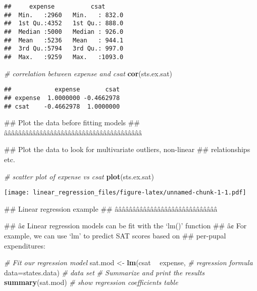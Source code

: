 \documentclass[]{article}
\newenvironment{Shaded}{\begin{snugshade}}{\end{snugshade}}
\newcommand{\KeywordTok}[1]{\textcolor[rgb]{0.13,0.29,0.53}{\textbf{#1}}}
\newcommand{\DataTypeTok}[1]{\textcolor[rgb]{0.13,0.29,0.53}{#1}}
\newcommand{\StringTok}[1]{\textcolor[rgb]{0.31,0.60,0.02}{#1}}
\newcommand{\CommentTok}[1]{\textcolor[rgb]{0.56,0.35,0.01}{\textit{#1}}}
\newcommand{\OperatorTok}[1]{\textcolor[rgb]{0.81,0.36,0.00}{\textbf{#1}}}
\newcommand{\NormalTok}[1]{#1}
\begin{document}
\begin{verbatim}
##     expense          csat       
##  Min.   :2960   Min.   : 832.0  
##  1st Qu.:4352   1st Qu.: 888.0  
##  Median :5000   Median : 926.0  
##  Mean   :5236   Mean   : 944.1  
##  3rd Qu.:5794   3rd Qu.: 997.0  
##  Max.   :9259   Max.   :1093.0
\end{verbatim}

\begin{Shaded}
\begin{Highlighting}[]
\CommentTok{# correlation between expense and csat}
\KeywordTok{cor}\NormalTok{(sts.ex.sat)}
\end{Highlighting}
\end{Shaded}

\begin{verbatim}
##            expense       csat
## expense  1.0000000 -0.4662978
## csat    -0.4662978  1.0000000
\end{verbatim}

\begin{Shaded}
\begin{Highlighting}[]
\NormalTok{## Plot the data before fitting models}
\NormalTok{## âââââââââââââââââââââââââââââââââââââââ}

\NormalTok{##   Plot the data to look for multivariate outliers, non-linear}
\NormalTok{##   relationships etc.}

\CommentTok{# scatter plot of expense vs csat}
\KeywordTok{plot}\NormalTok{(sts.ex.sat)}
\end{Highlighting}
\end{Shaded}

\texttt{[image: linear\_regression\_files/figure-latex/unnamed-chunk-1-1.pdf]}

\begin{Shaded}
\begin{Highlighting}[]
\NormalTok{## Linear regression example}
\NormalTok{## âââââââââââââââââââââââââââââ}

\NormalTok{##   â¢ Linear regression models can be fit with the `lm()' function}
\NormalTok{##   â¢ For example, we can use `lm' to predict SAT scores based on}
\NormalTok{##     per-pupal expenditures:}

\CommentTok{# Fit our regression model}
\NormalTok{sat.mod <-}\StringTok{ }\KeywordTok{lm}\NormalTok{(csat }\OperatorTok{~}\StringTok{ }\NormalTok{expense, }\CommentTok{# regression formula}
              \DataTypeTok{data=}\NormalTok{states.data) }\CommentTok{# data set}
\CommentTok{# Summarize and print the results}
\KeywordTok{summary}\NormalTok{(sat.mod) }\CommentTok{# show regression coefficients table}
\end{Highlighting}
\end{Shaded}
\end{document}
